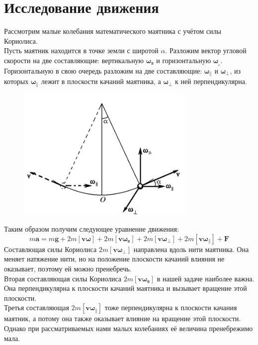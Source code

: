 \documentclass[a4, 12pt]{article}
\begin{document}
\section{Исследование движения}
Рассмотрим малые колебания математического маятника с учётом силы Кориолиса.\\
Пусть маятник находится в точке земли с широтой $\alpha$. Разложим вектор угловой скорости на две составляющие: вертикальную $\boldsymbol{\omega_\text{в}}$ и горизонтальную $\boldsymbol{\omega__\text{г}}$. Горизонтальную в свою очередь разложим на две составляющие: $\boldsymbol{\omega_\parallel}$ и $\boldsymbol{\omega_\perp}$, из которых $\boldsymbol{\omega_\parallel}$ лежит в плоскости качаний маятника, а $\boldsymbol{\omega_\perp}$ к ней перпендикулярна.
\begin{figure}[H]
    \centering
    \includegraphics[scale = 0.7]{фуко.png}
    \caption{}
\end{figure}
Таким образом получим следующее уравнение движения:
\begin{equation*}
    m\mathbf{a}=m\mathbf{g}+2m[\mathbf{v}\boldsymbol{\omega}]+2m[\mathbf{v}\boldsymbol{\omega_\textbf{в}}]+2m[\mathbf{v}\boldsymbol{\omega_\perp}]+2m[\mathbf{v}\boldsymbol{\omega_\parallel}]+\mathbf{F}
\end{equation*}
Составлющая силы Кориолиса $2m[\mathbf{v}\boldsymbol{\omega_\perp}]$ направлена вдоль нити маятника. Она меняет натяжение нити, но на положение плоскости качаний влияния не оказывает, поэтому ей можно пренебречь.\\
Вторая составляющая силы Кориолиса $2m[\mathbf{v}\boldsymbol{\omega_\textbf{в}}]$ в нашей задаче наиболее важна. Она перпендикулярна к плоскости качаний маятника и вызывает вращение этой плоскости.\\
Третья составляющая $2m[\mathbf{v}\boldsymbol{\omega_\parallel}]$ тоже перпендикулярна к плоскости качания маятник, а потому она также оказывает влияние на вращение этой плоскости. Однако при рассматриваемых нами малых колебаниях её величина пренебрежимо мала.\\
\end{document}
